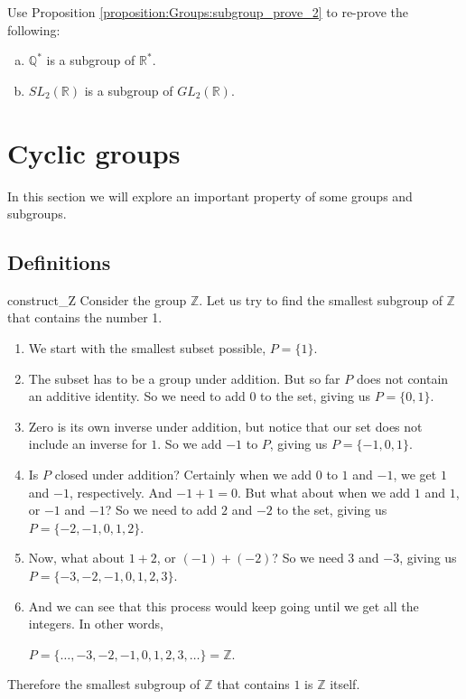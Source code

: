 \begin{exercise}{73}
Use Proposition \ref{proposition:Groups:subgroup_prove_2} to re-prove the following:
\begin{enumerate}[(a)]
\item
${\mathbb Q}^*$ is a subgroup of ${\mathbb R}^*$.
\item
$SL_2( {\mathbb R})$ is a subgroup of $GL_2( {\mathbb R})$.
\end{enumerate}
\end{exercise}


\section{Cyclic groups\quad
{}}
\label{sec:Groups:CyclicGroups}
 
In this section we will explore an important property of some groups and subgroups.  

\subsection{Definitions}
\label{subsec:Groups:CyclicGroups:CyclicGroups}

\begin{example}{construct_Z}
Consider the group ${\mathbb Z}$.  Let us try to find the smallest subgroup of ${\mathbb Z}$ that contains the number 1.
\begin{enumerate}[(1)]
\item
We start with the smallest subset possible, $P = \{ 1 \}$.
\item
The subset has to be a group under addition.  But so far $P$ does not contain an additive identity.  So we need to add $0$ to the set, giving us $P = \{ 0, 1 \}$. 
\item
Zero is its own inverse under addition, but notice that our set does not include an inverse for $1$.  So we add $-1$ to $P$, giving us  $P = \{ -1, 0, 1 \}$.
\item
Is $P$ closed under addition?  Certainly when we add $0$ to $1$ and $-1$, we get $1$ and $-1$, respectively.  And $-1 + 1 = 0$.  But what about when we add $1$ and $1$, or $-1$ and $-1$?  So we need to add $2$ and $-2$ to the set, giving us $P = \{ -2, -1, 0, 1, 2 \}$.
\item
Now, what about $1 + 2$, or $(-1) + (-2)$?  So we need $3$ and $-3$, giving us $P = \{ -3, -2, -1, 0, 1, 2, 3 \}$.
\item
And we can see that this process would keep going until we get all the integers.  In other words, 

\noindent
 $P = \{ \ldots, -3, -2, -1, 0, 1, 2, 3, \ldots \} = {\mathbb Z}$.
\end{enumerate}

\noindent
Therefore the smallest subgroup of $\mathbb Z$ that contains $1$ is $\mathbb Z$ itself.
\end{example}


